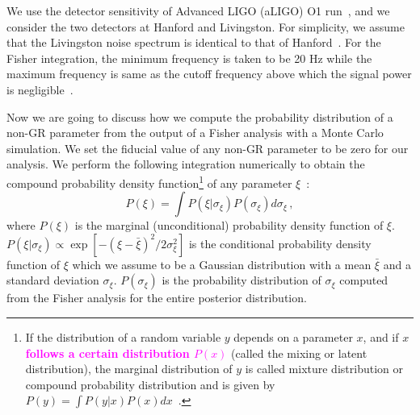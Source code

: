 \documentclass[prd,twocolumn,nofootinbib]{revtex4-1}
\newcommand\be{\begin{equation}}
\newcommand\ee{\end{equation}}
\newcommand{\lb}{\left(}
\newcommand{\rb}{\right)}
\newcommand{\kent}[1]{\textcolor{magenta}{\textbf{#1}} }
\begin{document}
We use the detector sensitivity of Advanced LIGO (aLIGO) O1 run~\cite{LIGOScientific:2018mvr}, and we consider the two detectors at Hanford and Livingston. For simplicity, we assume that the Livingston noise spectrum is identical to that of  Hanford~\cite{Yunes:2009yz}. For the Fisher integration, the minimum frequency is taken to be 20 Hz while the maximum frequency is same as the cutoff frequency above which the signal power is negligible~\cite{Ajith:2009bn}.


Now we are going to discuss how we compute the probability distribution of a non-GR parameter from the output of a Fisher analysis with a Monte Carlo simulation. We set the  fiducial value of any non-GR parameter to be zero for our analysis. We perform the following integration numerically to obtain the compound probability density function\footnote{If the distribution of a random variable $y$ depends on a parameter $x$, and if $x$ \kent{follows a certain distribution $P(x)$} (called the mixing or latent distribution), the marginal distribution of $y$ is called mixture distribution or compound probability distribution and is given by $P\left(y\right)=\int P\left(y|x\right) P\left(x\right)dx$~\cite{2016arXiv160204060R}.} of any parameter $\xi$~:
\be
\label{eq3:1}
P\lb\xi\rb=\int P\lb \xi|\sigma_{\xi}\rb P\lb \sigma_{\xi}\rb d\sigma_{\xi}\,,
\ee
where $P\lb\xi\rb$ is the marginal (unconditional) probability density function of $\xi$. $P\lb \xi|\sigma_{\xi}\rb \propto \exp[-(\xi-\bar \xi)^2/2\sigma_{\xi}^2]$ is the conditional probability density function of $\xi$ which we assume to be a Gaussian distribution with a mean $\bar \xi$ and a standard deviation $\sigma_\xi$. $P(\sigma_\xi)$ is the probability distribution of $\sigma_\xi$ computed from the Fisher analysis for the entire posterior distribution.
\end{document}
